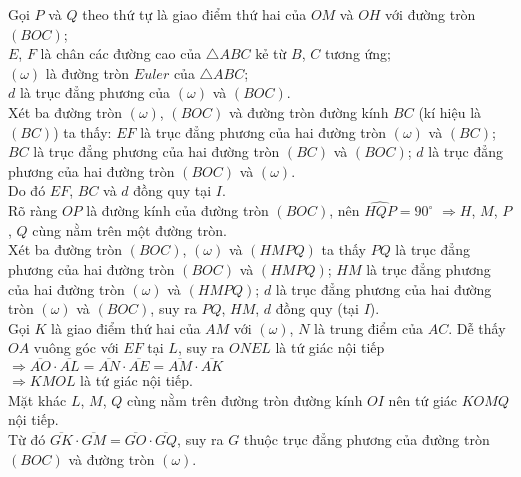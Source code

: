 \begin{bt}
{\begin{center}
		\end{center}
		Gọi $ P $ và $ Q $ theo thứ tự là giao điểm thứ hai của $ OM $ và $ OH $ với đường tròn $ \left(BOC\right) $;\\ $ E $, $ F $ là chân các đường cao của $ \triangle ABC $ kẻ từ $ B $, $ C $ tương ứng;\\ $ (\omega) $ là đường tròn $ Euler $ của $ \triangle ABC $; \\$ d $ là trục đẳng phương của $ (\omega) $ và $ (BOC) $. \\
		Xét ba đường tròn $ (\omega) $, $ (BOC) $ và đường tròn đường kính $ BC $ (kí hiệu là $ (BC) $) ta thấy: $ EF $ là trục đẳng phương của hai đường tròn $ (\omega) $ và $ (BC) $; $ BC $ là trục đẳng phương của hai đường tròn $ (BC) $ và $ (BOC) $; $ d $ là trục đẳng phương của hai đường tròn $ (BOC) $ và $ (\omega) $. \\
		Do đó $ EF $, $ BC $ và $ d $ đồng quy tại $ I. $\\
		Rõ ràng $ OP $ là đường kính của đường tròn $ (BOC) $, nên $ \widehat{HQP}=90^\circ $ $ \Rightarrow H $, $ M $, $ P $, $ Q $ cùng nằm trên một đường tròn.\\
		Xét ba đường tròn $ (BOC) $, $ (\omega) $ và $ (HMPQ) $ ta thấy $ PQ $ là trục đẳng phương của hai đường tròn $ (BOC) $ và $ (HMPQ) $; $ HM $ là trục đẳng phương của hai đường tròn $ (\omega) $ và $(HMPQ)  $; $ d $ là trục đẳng phương của hai đường tròn $ (\omega) $ và $(BOC)  $, suy ra $ PQ $, $ HM $, $ d $ đồng quy (tại $ I $). \\
		Gọi $ K $ là giao điểm thứ hai của $ AM $ với $ (\omega) $, $ N $ là trung điểm của $ AC $. Dễ thấy $ OA $ vuông góc với $ EF $ tại $ L $, suy ra $ ONEL $ là tứ giác nội tiếp
		\\$ \Rightarrow \overline{AO}\cdot \overline{AL}=\overline{AN}\cdot \overline{AE}=\overline{AM}\cdot \overline{AK}$\\
		$ \Rightarrow KMOL $ là tứ giác nội tiếp.\\
		Mặt khác $ L $, $ M $, $ Q $ cùng nằm trên đường tròn đường kính $ OI $ nên tứ giác $ KOMQ $ nội tiếp.\\
		Từ đó $ \overline{GK}\cdot \overline{GM}=\overline{GO}\cdot \overline{GQ} $, suy ra $ G$ thuộc trục đẳng phương của đường tròn $ (BOC) $ và đường tròn $ (\omega) $.
		
	}	
\end{bt}
